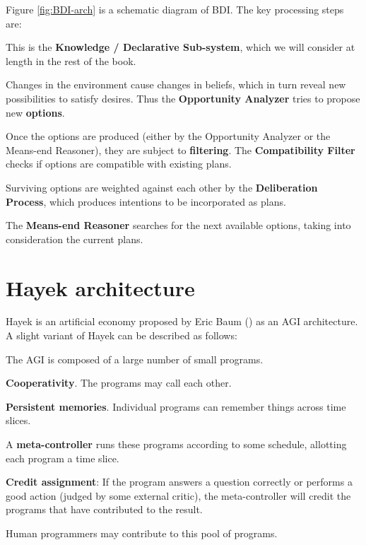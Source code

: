 \documentclass[a4paper]{report}
\begin{document}
Figure \ref{fig:BDI-arch} is a schematic diagram of BDI.  The key processing steps are:
\begin{compactenum}
\item  This is the \textbf{Knowledge / Declarative Sub-system}, which we will consider at length in the rest of the book.
\item  Changes in the environment cause changes in beliefs, which in turn reveal new possibilities to satisfy desires.  Thus the \textbf{Opportunity Analyzer} tries to propose new \textbf{options}.
\item  Once the options are produced (either by the Opportunity Analyzer or the Means-end Reasoner), they are subject to \textbf{filtering}.  The \textbf{Compatibility Filter} checks if options are compatible with existing plans.
\item  Surviving options are weighted against each other by the \textbf{Deliberation Process}, which produces intentions to be incorporated as plans.
\item  The \textbf{Means-end Reasoner} searches for the next available options, taking into consideration the current plans.
\end{compactenum}

\section{Hayek architecture}

Hayek is an artificial economy proposed by Eric Baum (\citep*{Baum2004}) as an AGI architecture.  A slight variant of Hayek can be described as follows:

\begin{compactenum}
\item The AGI is composed of a large number of small programs.
\item \textbf{Cooperativity}.  The programs may call each other.
\item \textbf{Persistent memories}.  Individual programs can remember things across time slices.
\item A \textbf{meta-controller} runs these programs according to some schedule, allotting each program a time slice.
\item \textbf{Credit assignment}:  If the program answers a question correctly or performs a good action (judged by some external critic), the meta-controller will credit the programs that have contributed to the result.
\item Human programmers may contribute to this pool of programs.\\
\end{compactenum}
\end{document}
